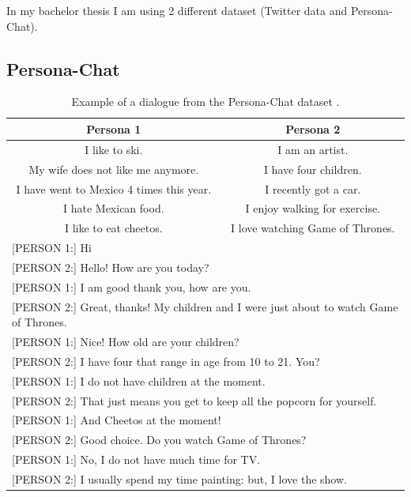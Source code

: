 In my bachelor thesis I am using 2 different dataset (Twitter data and Persona-Chat). 

\subsection{Persona-Chat}

\begin{table}[ht]
  \begin{tabular}{ |c|c| }
   \hline\hline
   \textbf{Persona 1} & \textbf{Persona 2}  \\ 
   \hline\hline
    I like to ski. & I am an artist. \\
    My wife does not like me anymore. & I have four children. \\
    I have went to Mexico 4 times this year. & I recently got a car. \\
    I hate Mexican food. & I enjoy walking for exercise. \\
    I like to eat cheetos. & I love watching Game of Thrones. \\
    \hline\hline
    \multicolumn{2}{l}{[PERSON 1:] Hi} \\
    \multicolumn{2}{l}{[PERSON 2:] Hello! How are you today?} \\
    \multicolumn{2}{l}{[PERSON 1:] I am good thank you, how are you.} \\
    \multicolumn{2}{l}{[PERSON 2:] Great, thanks! My children and I were just about to watch Game of Thrones.} \\
    \multicolumn{2}{l}{[PERSON 1:] Nice! How old are your children?} \\
    \multicolumn{2}{l}{[PERSON 2:] I have four that range in age from 10 to 21. You?} \\
    \multicolumn{2}{l}{[PERSON 1:] I do not have children at the moment.} \\
    \multicolumn{2}{l}{[PERSON 2:] That just means you get to keep all the popcorn for yourself.} \\
    \multicolumn{2}{l}{[PERSON 1:] And Cheetos at the moment!} \\
    \multicolumn{2}{l}{[PERSON 2:] Good choice. Do you watch Game of Thrones?} \\
    \multicolumn{2}{l}{[PERSON 1:] No, I do not have much time for TV.} \\
    \multicolumn{2}{l}{[PERSON 2:] I usually spend my time painting: but, I love the show.} \\
    \hline\hline
  \end{tabular}
  \caption{Example of a dialogue from the Persona-Chat dataset \cite{persona_chat}.}
\label{tab:persona_chat}
\end{table}

